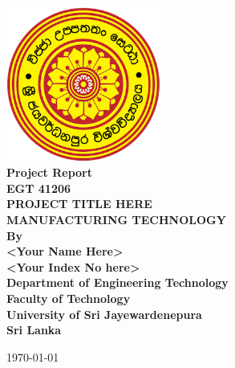 \documentclass[12pt,a4paper,oneside]{article}
\begin{document}
\begin{titlepage}

    \begin{flushright}
    \end{flushright}


    \center %
    {
        \includegraphics[width=2in,keepaspectratio]{logo.png}\\[0.5cm]
        \fontsize{16pt}{24}\selectfont \textbf{Project Report}\\[0.5cm]
        \fontsize{16pt}{24}\selectfont \textbf{EGT 41206}\\[0.75cm]
        \fontsize{24pt}{30}\selectfont \textbf{\uppercase{Project Title Here}}\\[1.5cm]
        \fontsize{16}{24}\selectfont \textbf{\uppercase{Manufacturing Technology}}\\[1.5cm]
        \fontsize{16pt}{24}\selectfont \textbf{By}\\[0.5cm]
        \fontsize{12pt}{12}\selectfont {
        }
        \vspace*{\fill}
        \fontsize{12pt}{12}\selectfont \textbf { <Your Name Here> \\ <Your Index No here>}\\[0.5cm]


        \vspace*{\fill}
        \fontsize{12pt}{12}\selectfont \textbf {Department of Engineering Technology \\ Faculty of Technology\\University of Sri Jayewardenepura\\ Sri Lanka \\ }
        \vspace*{\fill}

        \today
    }


\end{titlepage}
\end{document}
